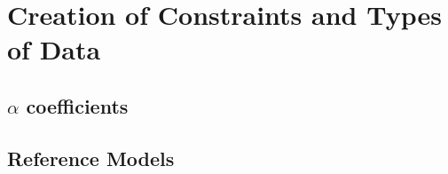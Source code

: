 \section{Creation of Constraints and Types of Data}
\label{sec:Creation of Constraints:TKC}




\subsection{$\alpha$ coefficients}
\label{sec:alpha coefficients:TKC}


\subsection{Reference Models}
%
%
%
%
%
%

